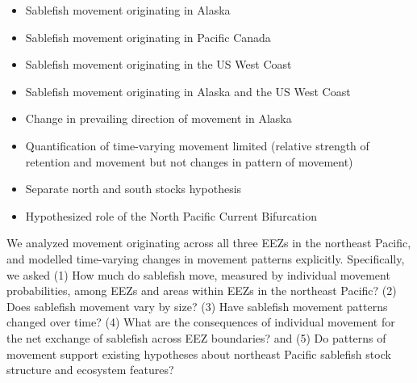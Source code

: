 \documentclass{article}
\begin{document}
\begin{itemize}
\item Sablefish movement originating in Alaska \cite[][]{heifetz1991, maloney2008,hanselman2015}
\item Sablefish movement originating in Pacific Canada \cite[][]{beamish1988,cleary2007}
\item Sablefish movement originating in the US West Coast \cite[][]{sogard2017}
\item Sablefish movement originating in Alaska and the US West Coast \cite[][]{kimura1998}
\item Change in prevailing direction of movement in Alaska \cite[][]{heifetz1991,hanselman2015}
\item Quantification of time-varying movement limited \cite[][]{hanselman2015} (relative strength of retention and movement but not changes in pattern of movement) %
\item Separate north and south stocks hypothesis \cite[][]{kimura1998}
\item Hypothesized role of the North Pacific Current Bifurcation \cite[][]{kapur2020}
\end{itemize}

We analyzed movement originating across all three EEZs in the northeast Pacific, and modelled time-varying changes in movement patterns explicitly. Specifically, we asked (1) How much do sablefish move, measured by individual movement probabilities, among EEZs and areas within EEZs in the northeast Pacific? (2) Does sablefish movement vary by size? (3) Have sablefish movement patterns changed over time? (4) What are the consequences of individual movement for the net exchange of sablefish across EEZ boundaries? and (5) Do patterns of movement support existing hypotheses about northeast Pacific sablefish stock structure and ecosystem features? %
\end{document}
